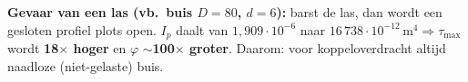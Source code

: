 \documentclass[10pt]{article}
\begin{document}
\begin{tipbox}
\textbf{Gevaar van een las (vb.\ buis $D{=}80$, $d{=}6$):} barst de las, dan wordt een gesloten profiel plots open. $I_p$ daalt van $1{,}909\cdot10^{-6}$ naar $16\,738\cdot10^{-12}\,\text{m}^4 \Rightarrow \tau_{\max}$ wordt \textbf{18$\times$ hoger} en $\varphi$ \textbf{$\sim$100$\times$ groter}. Daarom: voor koppeloverdracht altijd naadloze (niet-gelaste) buis.
\end{tipbox}
\end{document}

